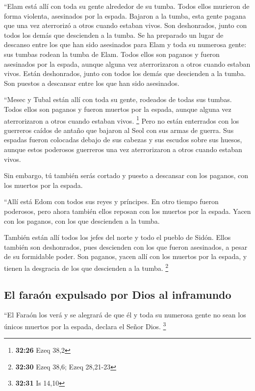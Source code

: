  ``Elam está allí con toda su gente alrededor de su
tumba. Todos ellos murieron de forma violenta, asesinados por la espada.
Bajaron a la tumba, esta gente pagana que una vez aterrorizó a otros
cuando estaban vivos. Son deshonrados, junto con todos los demás que
descienden a la tumba.  Se ha preparado un lugar de
descanso entre los que han sido asesinados para Elam y toda su numerosa
gente: sus tumbas rodean la tumba de Elam. Todos ellos son paganos y
fueron asesinados por la espada, aunque alguna vez aterrorizaron a otros
cuando estaban vivos. Están deshonrados, junto con todos los demás que
descienden a la tumba. Son puestos a descansar entre los que han sido
asesinados.

 ``Mesec y Tubal están allí con toda su gente, rodeados
de todas sus tumbas. Todos ellos son paganos y fueron muertos por la
espada, aunque alguna vez aterrorizaron a otros cuando estaban vivos.
\footnote{\textbf{32:26} Ezeq 38,2}  Pero no están
enterrados con los guerreros caídos de antaño que bajaron al Seol con
sus armas de guerra. Sus espadas fueron colocadas debajo de sus cabezas
y sus escudos sobre sus huesos, aunque estos poderosos guerreros una vez
aterrorizaron a otros cuando estaban vivos.

 Sin embargo, tú también serás cortado y puesto a
descansar con los paganos, con los muertos por la espada.

 ``Allí está Edom con todos sus reyes y príncipes. En
otro tiempo fueron poderosos, pero ahora también ellos reposan con los
muertos por la espada. Yacen con los paganos, con los que descienden a
la tumba.

 También están allí todos los jefes del norte y todo el
pueblo de Sidón. Ellos también son deshonrados, pues descienden con los
que fueron asesinados, a pesar de su formidable poder. Son paganos,
yacen allí con los muertos por la espada, y tienen la desgracia de los
que descienden a la tumba. \footnote{\textbf{32:30} Ezeq 38,6; Ezeq
  28,21-23}

\hypertarget{el-farauxf3n-expulsado-por-dios-al-inframundo}{%
\subsection{El faraón expulsado por Dios al
inframundo}\label{el-farauxf3n-expulsado-por-dios-al-inframundo}}

 ``El Faraón los verá y se alegrará de que él y toda su
numerosa gente no sean los únicos muertos por la espada, declara el
Señor Dios. \footnote{\textbf{32:31} Is 14,10}

